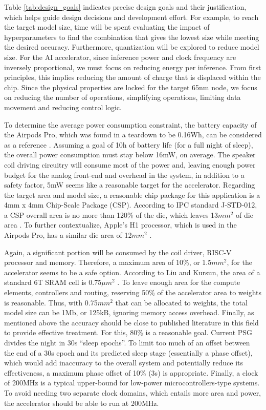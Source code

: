 \documentclass[12pt, hidelinks, draft]{article}
\begin{document}
Table \ref{tab:design_goals} indicates precise design goals and their justification, which helps guide design decisions and development effort. For example, to
reach the target model size, time will be spent evaluating the impact of hyperparameters to find the combination that gives the lowest size while meeting the desired
accuracy. Furthermore, quantization will be explored to reduce model size. For the AI accelerator, since inference power and clock frequency are inversely proportional,
we must focus on reducing energy per inference. From first principles, this implies reducing the amount of charge that is displaced within the chip. Since the physical
properties are locked for the target 65nm node, we focus on reducing the number of operations, simplifying operations, limiting data movement and reducing control logic.

To determine the average power consumption constraint, the battery capacity of the Airpods Pro, which was found in a teardown to be 0.16Wh, can be considered as a
reference \cite*{AirpodsIfixitTeardown}. Assuming a goal of 10h of battery life (for a full night of sleep), the overall power consumption must stay below 16mW, on average.
The speaker coil driving circuitry will consume most of the power and, leaving enough power budget for the analog front-end and overhead in the system, in addition to a
safety factor, 5mW seems like a reasonable target for the accelerator. Regarding the target area and model size, a reasonable chip package for this application is a 4mm x 4mm
Chip-Scale Package (CSP). According to IPC standard J-STD-012, a CSP overall area is no more than 120\% of the die, which leaves 13$mm^2$ of die area \cite*{J_STD_012}. To
further contextualize, Apple's H1 processor, which is used in the Airpods Pro, has a similar die area of 12$mm^2$ \cite*{H1DieSize}.

Again, a significant portion will be consumed by the coil driver, RISC-V processor and memory. Therefore, a maximum area of 10\%, or 1.5$mm^2$, for the accelerator seems to be a safe
option. According to Liu and Kursun, the area of a standard 6T SRAM cell is 0.75$\mu m^2$ \cite*{liu2008characterization}. To leave enough area for the compute elements,
controllers and routing, reserving 50\% of the accelerator area to weights is reasonable. Thus, with 0.75$mm^2$ that can be allocated to weights, the total model size can be
1Mb, or 125kB, ignoring memory access overhead. Finally, as mentioned above the accuracy should be close to published literature in this field to provide effective treatment.
For this, 80\% is a reasonable goal. Current PSG divides the night in 30s ``sleep epochs''. To limit too much of an offset between the end of a 30s epoch and its predicted
sleep stage (essentially a phase offset), which would add inaccuracy to the overall system and potentially reduce its effectiveness, a maximum phase offset of 10\% (3s)
is appropriate. Finally, a clock of 200MHz is a typical upper-bound for low-power microcontrollers-type systems. To avoid needing two separate clock domains, which entails
more area and power, the accelerator should be able to run at 200MHz.
\end{document}
